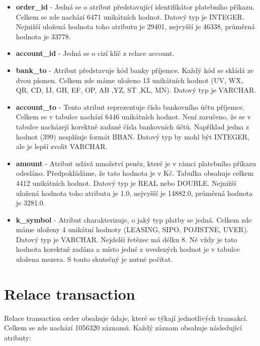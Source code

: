 \documentclass{article}
\begin{document}
\begin{itemize}

	\item \textbf{order\_id} - Jedná se o atribut představující identifikátor platebního příkazu. Celkem se zde nachází 6471 unikátních hodnot. Datový typ je INTEGER. Nejnižší uložená hodnota toho atributu je 29401, nejvyšší je 46338, průměrná hodnota je 33778.

	\item \textbf{account\_id} - Jedná se o cizí klíč z relace account.
	
	\item \textbf{bank\_to} - Atribut představuje kód banky příjemce. Každý kód se skládá ze dvou písmen. Celkem zde máme uloženo 13 unikátních hodnot (UV, WX, QR, CD, IJ, GH, EF, OP, AB ,YZ, ST ,KL, MN). Datový typ je VARCHAR.

	
	\item \textbf{account\_to} - Tento atribut reprezentuje číslo bankovního účtu příjemce. Celkem se v tabulce nachází 6446 unikátních hodnot. Není zaručeno, že se v tabulce nacházejí korektně zadané čísla bankovních účtů. Například jedna z hodnot (399) nesplňuje formát BBAN. Datový typ by mohl být INTEGER, ale je lepší zvolit VARCHAR.
	
	\item \textbf{amount} - Atribut udává množství peněz, které je v rámci platebního příkazu odesláno. Předpokládáme, že tato hodnota je v Kč. Tabulka obsahuje celkem 4412 unikátních hodnot. Datový typ je REAL nebo DOUBLE. Nejnižší uložená hodnota toho atributu je 1.0, nejvyšší je 14882.0, průměrná hodnota je 3281.0.

	
	\item \textbf{k\_symbol} - Atribut charakterizuje, o jaký typ platby se jedná. Celkem zde máme uloženy 4 unikátní hodnoty (LEASING, SIPO, POJISTNE, UVER). Datový typ je VARCHAR. Nejdelší řetězec má délku 8. Né vždy je tato hodnota korektně zadána a místo jedné z uvedených hodnot je v tabulce uložena mezera. S touto skutečný je nutné počítat.
	
\end{itemize}

\section{Relace transaction}

Relace transaction order obsahuje údaje, které se týkají jednotlivých transakcí. Celkem se zde nachází 1056320 záznamů. Každý záznam obsahuje následující atributy:
\end{document}
